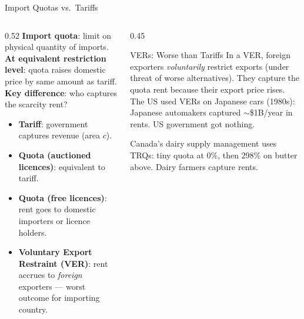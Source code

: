 \documentclass[aspectratio=169]{beamer}
\begin{document}
\begin{frame}{Import Quotas vs.\ Tariffs}
\begin{columns}
\begin{column}{0.52\textwidth}
\textbf{Import quota}: limit on physical quantity of imports.\\[0.3em]
\textbf{At equivalent restriction level}: quota raises domestic price by same amount as tariff.\\[0.3em]
\textbf{Key difference}: who captures the scarcity rent?
\begin{itemize}
  \item \textbf{Tariff}: government captures revenue (area $c$).
  \item \textbf{Quota (auctioned licences)}: equivalent to tariff.
  \item \textbf{Quota (free licences)}: rent goes to domestic importers or licence holders.
  \item \textbf{Voluntary Export Restraint (VER)}: rent accrues to \emph{foreign} exporters --- worst outcome for importing country.
\end{itemize}
\end{column}
\begin{column}{0.45\textwidth}
\begin{alertblock}{VERs: Worse than Tariffs}
  In a VER, foreign exporters \emph{voluntarily} restrict exports (under threat of worse alternatives). They capture the quota rent because their export price rises.\\[0.3em]
  The US used VERs on Japanese cars (1980s): Japanese automakers captured $\sim$\$1B/year in rents. US government got nothing.
\end{alertblock}
\vspace{0.2em}
\begin{canadex}
  Canada's dairy supply management uses TRQs: tiny quota at 0\%, then 298\% on butter above. Dairy farmers capture rents.
\end{canadex}
\end{column}
\end{columns}
\end{frame}
\end{document}

